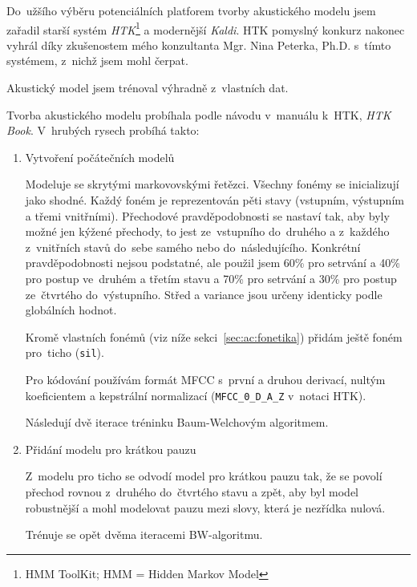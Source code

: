 Do~užšího výběru potenciálních platforem tvorby akustického modelu jsem zařadil
starší systém \textit{HTK}\footnote{HMM ToolKit; HMM = Hidden Markov Model}\cite{young2002htk} a
modernější \textit{Kaldi}\cite{povey2011kaldi}. HTK pomyslný konkurz nakonec vyhrál díky zkušenostem
mého konzultanta Mgr. Nina Peterka, Ph.D. s~tímto systémem, z~nichž jsem mohl
čerpat.

Akustický model jsem trénoval výhradně z~vlastních dat.

Tvorba akustického modelu probíhala podle návodu v~manuálu k~HTK, \textit{HTK
Book}. V~hrubých rysech probíhá takto:

\begin{enumerate}

\item{Vytvoření počátečních modelů}

Modeluje se skrytými markovovskými řetězci. Všechny fonémy se inicializují jako
shodné. Každý foném je reprezentován pěti stavy (vstupním, výstupním a třemi
vnitřními). Přechodové pravděpodobnosti se nastaví tak, aby byly možné jen
kýžené přechody, to jest ze~vstupního do~druhého a z~každého z~vnitřních stavů
do~sebe samého nebo do~následujícího. Konkrétní pravděpodobnosti nejsou
podstatné, ale použil jsem 60\% pro setrvání a 40\% pro postup ve~druhém a
třetím stavu a 70\% pro setrvání a 30\% pro postup ze~čtvrtého do~výstupního.
Střed a variance jsou určeny identicky podle globálních hodnot.

Kromě vlastních fonémů (viz níže sekci~\ref{sec:ac:fonetika}) přidám ještě foném
pro~ticho (\texttt{sil}).

Pro kódování používám formát MFCC s~první a druhou derivací, nultým koeficientem
a kepstrální normalizací (\texttt{MFCC\_0\_D\_A\_Z} v~notaci HTK).

Následují dvě iterace tréninku Baum-Welchovým algoritmem\cite{welch2003hidden}.

\item{Přidání modelu pro krátkou pauzu}

Z~modelu pro ticho se odvodí model pro krátkou pauzu tak, že se povolí přechod
rovnou z~druhého do~čtvrtého stavu a zpět, aby byl model robustnější a mohl
modelovat pauzu mezi slovy, která je nezřídka nulová.

Trénuje se opět dvěma iteracemi BW-algoritmu.


\end{enumerate}
